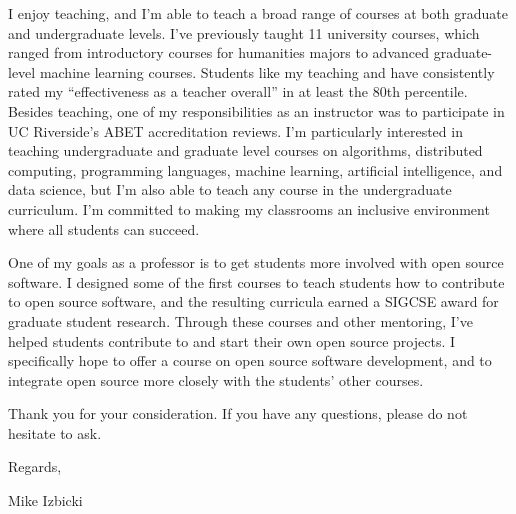 \documentclass[12pt]{article}
\newcommand{\school}[2]{\textcolor{red}{\textbf{{#1}:} {#2}}}
\begin{document}
\noindent
I enjoy teaching,
and I'm able to teach a broad range of courses at both graduate and undergraduate levels.
I've previously taught 11 university courses,
which ranged from introductory courses for humanities majors to advanced graduate-level machine learning courses.
Students like my teaching and have consistently rated my ``effectiveness as a teacher overall'' in at least the 80th percentile.
Besides teaching, one of my responsibilities as an instructor was to participate in UC Riverside's ABET accreditation reviews.
I'm particularly interested in teaching undergraduate and graduate level courses on algorithms, distributed computing, programming languages, machine learning, artificial intelligence, and data science,
but I'm also able to teach any course in the undergraduate curriculum.
I'm committed to making my classrooms an inclusive environment where all students can succeed.

\noindent
One of my goals as a professor is to get students more involved with open source software.
I designed some of the first courses to teach students how to contribute to open source software,
and the resulting curricula earned a SIGCSE award for graduate student research.
Through these courses and other mentoring, 
I've helped students contribute to and start their own open source projects.
I specifically hope to offer a course on open source software development,
and to integrate open source more closely with the students' other courses.

\noindent
Thank you for your consideration.
If you have any questions,
please do not hesitate to ask.

\noindent
Regards,

\vspace{-0.15in}
\noindent
Mike Izbicki

%
%
%
%
%
\end{document}
